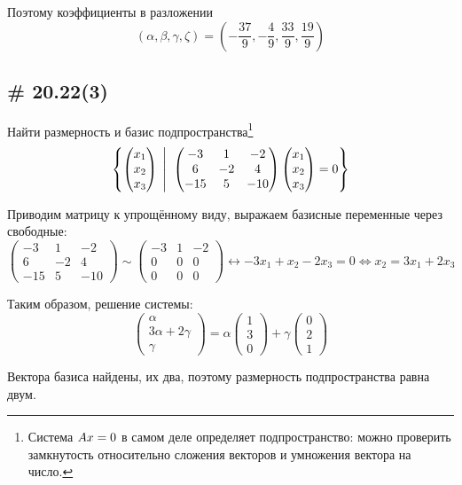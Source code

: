 \documentclass[a4paper,12pt]{article}
\newcommand{\BigMiddleThree}{\;\left|\vphantom{\begin{pmatrix} 0\\0\\0 \end{pmatrix}}\right.\;}
\begin{document}
  Поэтому коэффициенты в разложении
  \[
    (\alpha, \beta,  \gamma, \zeta) = \left(-\frac{37}{9}, -\frac{4}{9}, \frac{33}{9}, \frac{19}{9}\right)
  \]
  
  
  \subsection{\# 20.22(3)}
  
  Найти размерность и базис подпространства\footnote{Система $Ax \hm= 0$ в самом деле определяет подпространство: можно проверить замкнутость относительно сложения векторов и умножения вектора на число.}
  \[
    \left\{
      \begin{pmatrix}
        x_1 \\ x_2 \\ x_3
      \end{pmatrix}
      \BigMiddleThree
      \begin{pmatrix}
        -3 & 1 & -2\\
        6 & -2 & 4\\
        -15 & 5 & -10
      \end{pmatrix}
      \begin{pmatrix}
        x_1 \\ x_2 \\ x_3
      \end{pmatrix}
      = 0
    \right\}
  \]
  
  \begin{solution}
    Приводим матрицу к упрощённому виду, выражаем базисные переменные через свободные:
    \[
      \begin{pmatrix}
        -3 & 1 & -2\\
        6 & -2 & 4\\
        -15 & 5 & -10
      \end{pmatrix}
      \sim \begin{pmatrix}
        -3 & 1 & -2\\
        0 & 0 & 0\\
        0 & 0 & 0
      \end{pmatrix}
      \leftrightarrow -3x_1 + x_2 - 2x_3 = 0
      \Leftrightarrow x_2 = 3x_1 + 2x_3
    \]
    
    Таким образом, решение системы:
    \[
      \begin{pmatrix}
        \alpha \\ 3\alpha + 2\gamma \\ \gamma
      \end{pmatrix}
      = \alpha \begin{pmatrix}
        1 \\ 3 \\ 0
      \end{pmatrix} + \gamma \begin{pmatrix}
        0 \\ 2 \\ 1
      \end{pmatrix}
    \]
    
    Вектора базиса найдены, их два, поэтому размерность подпространства равна двум.
  \end{solution}
\end{document}
